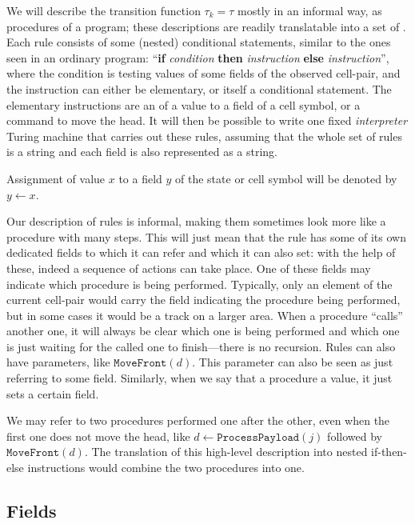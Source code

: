 \documentclass[11pt]{memoir}
\theoremstyle{definition} %
\newcommand{\rul}[1]{\ensuremath{\texttt{#1}}}
\newcommand{\increment}[1]{#1\mathord{+}\mathord{+}}
\newcommand{\decrement}[1]{#1\mathord{-}\mathord{-}}
\newcommand{\MoveFront}{\rul{MoveFront}}
\newcommand{\ProcessPayload}{\rul{ProcessPayload}}
\begin{document}
We will describe the transition function
\( \tau_{k}=\tau \)  mostly in an informal way, as procedures of a program;
these descriptions are readily translatable into a set of .
Each rule consists of some (nested) conditional statements,
similar to the ones seen in an ordinary program:
 ``\textbf{if} \textit{condition} \textbf{then} \textit{instruction}
\textbf{else} \textit{instruction}'', 
where the condition is testing values of some fields of the observed cell-pair, and
the instruction can either be elementary, or itself a conditional statement. 
The elementary instructions are an  of a value to a field
of a cell symbol, or a command to move the head.
It will then be possible to write one fixed \emph{interpreter} Turing machine that carries
out these rules, assuming that the whole set of rules is a string and each field is also represented
as a string.

Assignment of value \( x \) to a field \( y \) of the state or cell symbol will
be denoted by \( y \gets x \).

Our description of rules is informal, making them sometimes look more like a procedure with
many steps.
This will just mean that the rule has some of its own dedicated fields to which it can refer and which
it can also set: with the help of these, indeed a sequence of actions can take place.
One of these fields may indicate which procedure is being performed.
Typically, only an element of the current cell-pair would carry the field indicating the
procedure being performed, but in some cases it would be a track on a larger area.
When a procedure ``calls'' another one, it will always be clear which one is being performed
and which one is just waiting for the called one to finish---there is no recursion.
Rules can also have parameters, like \( \MoveFront(d) \).
This parameter can also be seen as just referring to some field.
Similarly, when we say that a procedure  a value, it just sets a certain field.

We may refer to two procedures performed one after the other, even 
when the first one does not move the head, like
\( d\gets\ProcessPayload(j) \) followed by \( \MoveFront(d) \).
The translation of this high-level description into
nested if-then-else instructions would combine the two procedures into one.

\subsection{Fields}\label{sec:fields}
\end{document}
